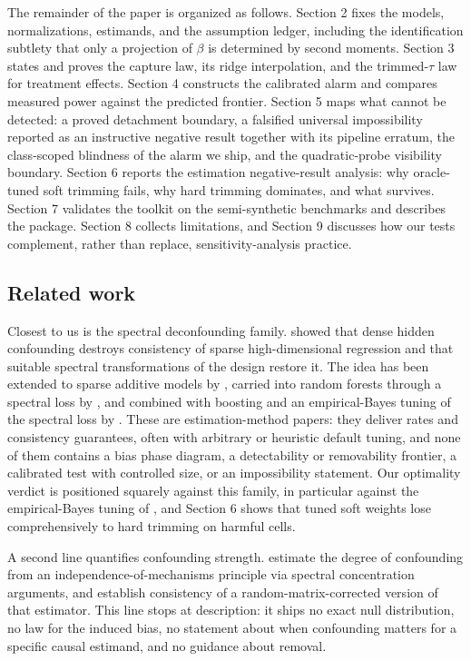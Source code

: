 The remainder of the paper is organized as follows. Section 2 fixes the models, normalizations, estimands, and the assumption ledger, including the identification subtlety that only a projection of $\beta$ is determined by second moments. Section 3 states and proves the capture law, its ridge interpolation, and the trimmed-$\tau$ law for treatment effects. Section 4 constructs the calibrated alarm and compares measured power against the predicted frontier. Section 5 maps what cannot be detected: a proved detachment boundary, a falsified universal impossibility reported as an instructive negative result together with its pipeline erratum, the class-scoped blindness of the alarm we ship, and the quadratic-probe visibility boundary. Section 6 reports the estimation negative-result analysis: why oracle-tuned soft trimming fails, why hard trimming dominates, and what survives. Section 7 validates the toolkit on the semi-synthetic benchmarks and describes the package. Section 8 collects limitations, and Section 9 discusses how our tests complement, rather than replace, sensitivity-analysis practice.

\subsection{Related work}\label{sec:related}

Closest to us is the spectral deconfounding family. \citet{cevid2020spectral} showed that dense hidden confounding destroys consistency of sparse high-dimensional regression and that suitable spectral transformations of the design restore it. The idea has been extended to sparse additive models by \citet{scheidegger2024spectral}, carried into random forests through a spectral loss by \citet{ulmer2025sdforest}, and combined with boosting and an empirical-Bayes tuning of the spectral loss by \citet{nava2026sdboost}. These are estimation-method papers: they deliver rates and consistency guarantees, often with arbitrary or heuristic default tuning, and none of them contains a bias phase diagram, a detectability or removability frontier, a calibrated test with controlled size, or an impossibility statement. Our optimality verdict is positioned squarely against this family, in particular against the empirical-Bayes tuning of \citet{nava2026sdboost}, and Section 6 shows that tuned soft weights lose comprehensively to hard trimming on harmful cells.

A second line quantifies confounding strength. \citet{janzing2018detecting} estimate the degree of confounding from an independence-of-mechanisms principle via spectral concentration arguments, and \citet{rendsburg2024consistent} establish consistency of a random-matrix-corrected version of that estimator. This line stops at description: it ships no exact null distribution, no law for the induced bias, no statement about when confounding matters for a specific causal estimand, and no guidance about removal.

